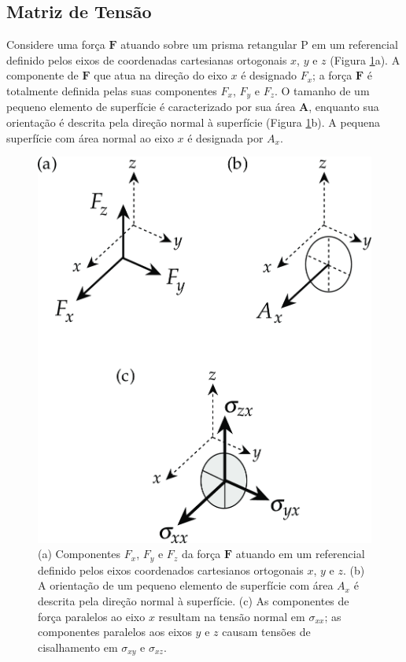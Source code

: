 \documentclass[]{book}
\theoremstyle{definition}
\theoremstyle{definition}
\theoremstyle{definition}
\theoremstyle{remark}
\begin{document}
\hypertarget{matriz-de-tensao}{%
\subsection{Matriz de Tensão}\label{matriz-de-tensao}}

Considere uma força \(\mathbf{F}\) atuando sobre um prisma retangular \(\mathrm{P}\) em um referencial definido pelos eixos de coordenadas cartesianas ortogonais \(x\), \(y\) e \(z\) (Figura \ref{fig:tension}a). A componente de \(\mathbf{F}\) que atua na direção do eixo \(x\) é designado \({F_x}\); a força \(\mathbf{F}\) é totalmente definida pelas suas componentes \({F_x}\), \(F_y\) e \({F_z}\). O tamanho de um pequeno elemento de superfície é caracterizado por sua área \(\mathbf{A}\), enquanto sua orientação é descrita pela direção normal à superfície (Figura \ref{fig:tension}b). A pequena superfície com área normal ao eixo \({x}\) é designada por \({A_x}\).

\begin{figure}

{\centering \includegraphics[width=0.7\linewidth]{fig/Fig_03.03} 

}

\caption{(a) Componentes $F_x$, $F_y$ e $F_z$ da força $\mathbf{F}$ atuando em um referencial definido pelos eixos coordenados cartesianos ortogonais $x$, $y$ e $z$. (b) A orientação de um pequeno elemento de superfície com área $A_x$ é descrita pela direção normal à superfície. (c) As componentes de força paralelos ao eixo $x$ resultam na tensão normal em $\sigma_{xx}$; as componentes paralelos aos eixos $y$ e $z$ causam tensões de cisalhamento em $\sigma_{xy}$ e  $\sigma_{xz}$.}\label{fig:tension}
\end{figure}
\end{document}
